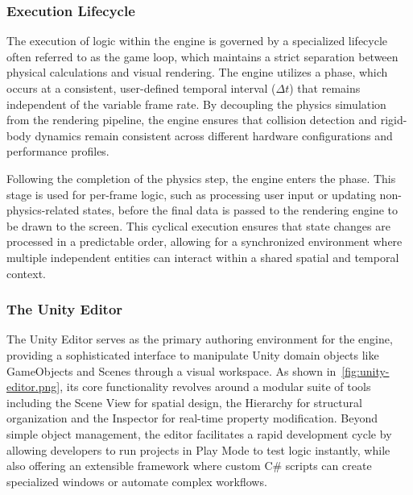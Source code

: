 \subsubsection{Execution Lifecycle}
The execution of logic within the engine is governed by a specialized lifecycle often referred to as the game loop, which maintains a strict separation between physical calculations and visual rendering. The engine utilizes a  phase, which occurs at a consistent, user-defined temporal interval ($\Delta t$) that remains independent of the variable frame rate. By decoupling the physics simulation from the rendering pipeline, the engine ensures that collision detection and rigid-body dynamics remain consistent across different hardware configurations and performance profiles.

Following the completion of the physics step, the engine enters the  phase. This stage is used for per-frame logic, such as processing user input or updating non-physics-related states, before the final data is passed to the rendering engine to be drawn to the screen. This cyclical execution ensures that state changes are processed in a predictable order, allowing for a synchronized environment where multiple independent entities can interact within a shared spatial and temporal context.

\subsubsection{The Unity Editor}
The Unity Editor serves as the primary authoring environment for the engine, providing a sophisticated interface to manipulate Unity domain objects like GameObjects and Scenes through a visual workspace. As shown in~\cref{fig:unity-editor.png}, its core functionality revolves around a modular suite of tools including the Scene View for spatial design, the Hierarchy for structural organization and the Inspector for real-time property modification. Beyond simple object management, the editor facilitates a rapid development cycle by allowing developers to run projects in Play Mode to test logic instantly, while also offering an extensible framework where custom C\# scripts can create specialized windows or automate complex workflows.


